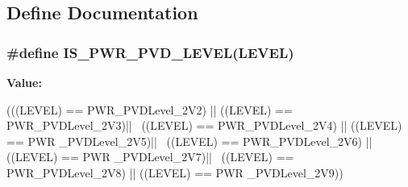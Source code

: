 \subsection{Define Documentation}
\hypertarget{group__PVD__detection__level_gabac4485a57abc97aad91eaa0b65ae927}{
\subsubsection[{IS\_\-PWR\_\-PVD\_\-LEVEL}]{\setlength{\rightskip}{0pt plus 5cm}\#define IS\_\-PWR\_\-PVD\_\-LEVEL(LEVEL)}}
\label{group__PVD__detection__level_gabac4485a57abc97aad91eaa0b65ae927}
{\bfseries Value:}
\begin{DoxyCode}
(((LEVEL) == PWR_PVDLevel_2V2) || ((LEVEL) == PWR_PVDLevel_2V3)|| \
                                 ((LEVEL) == PWR_PVDLevel_2V4) || ((LEVEL) == PWR
      _PVDLevel_2V5)|| \
                                 ((LEVEL) == PWR_PVDLevel_2V6) || ((LEVEL) == PWR
      _PVDLevel_2V7)|| \
                                 ((LEVEL) == PWR_PVDLevel_2V8) || ((LEVEL) == PWR
      _PVDLevel_2V9))
\end{DoxyCode}
